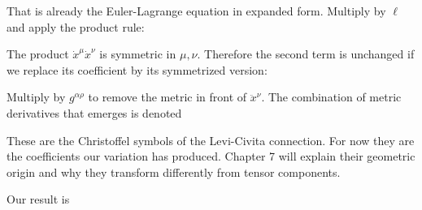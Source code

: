 \documentclass[
  11pt,
  letterpaper,
  oneside,
  openany]{scrbook}
\begin{document}
That is already the Euler-Lagrange equation in expanded form. Multiply
by \(\ell\) and apply the product rule:

\begin{center}
\begingroup
{}
\ifdim\wd\grmathbox>\linewidth
\resizebox{\linewidth}{!}{\usebox{\grmathbox}}
\else\usebox{\grmathbox}\fi
\endgroup
\end{center}

The product \(\dot x^\mu\dot x^\nu\) is symmetric in \(\mu,\nu\).
Therefore the second term is unchanged if we replace its coefficient by
its symmetrized version:

\begin{center}
\begingroup
{}
\ifdim\wd\grmathbox>\linewidth
\resizebox{\linewidth}{!}{\usebox{\grmathbox}}
\else\usebox{\grmathbox}\fi
\endgroup
\end{center}

Multiply by \(g^{\alpha\rho}\) to remove the metric in front of
\(\ddot x^\nu\). The combination of metric derivatives that emerges is
denoted

\begin{center}
\begingroup
{}
\ifdim\wd\grmathbox>\linewidth
\resizebox{\linewidth}{!}{\usebox{\grmathbox}}
\else\usebox{\grmathbox}\fi
\endgroup
\end{center}

These are the Christoffel symbols of the Levi-Civita connection. For now
they are the coefficients our variation has produced. Chapter 7 will
explain their geometric origin and why they transform differently from
tensor components.

Our result is

\begin{center}
\begingroup
{}
\ifdim\wd\grmathbox>\linewidth
\resizebox{\linewidth}{!}{\usebox{\grmathbox}}
\else\usebox{\grmathbox}\fi
\endgroup
\end{center}
\end{document}

